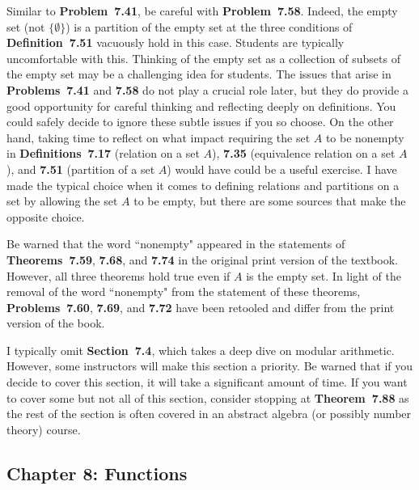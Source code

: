 \documentclass[11pt]{article}%
\newcommand{\blankline}{\pagebreak[2]\vspace{.5\baselineskip}}
\begin{document}
Similar to \textbf{Problem~7.41}, be careful with \textbf{Problem~7.58}. Indeed, the empty set (not $\{\emptyset\}$) is a partition of the empty set at the three conditions of \textbf{Definition~7.51} vacuously hold in this case.  Students are typically uncomfortable with this. Thinking of the empty set as a collection of subsets of the empty set may be a challenging idea for students.  The issues that arise in \textbf{Problems~7.41} and \textbf{7.58} do not play a crucial role later, but they do provide a good opportunity for careful thinking and reflecting deeply on definitions.  You could safely decide to ignore these subtle issues if you so choose.  On the other hand, taking time to reflect on what impact requiring the set $A$ to be nonempty in \textbf{Definitions~7.17} (relation on a set $A$), \textbf{7.35} (equivalence relation on a set $A$), and \textbf{7.51} (partition of a set $A$) would have could be a useful exercise.  I have made the typical choice when it comes to defining relations and partitions on a set by allowing the set $A$ to be empty, but there are some sources that make the opposite choice.

\blankline

Be warned that the word ``nonempty" appeared in the statements of \textbf{Theorems~7.59}, \textbf{7.68}, and \textbf{7.74} in the original print version of the textbook.  However, all three theorems hold true even if $A$ is the empty set.  In light of the removal of the word ``nonempty" from the statement of these theorems, \textbf{Problems~7.60}, \textbf{7.69}, and \textbf{7.72} have been retooled and differ from the print version of the book.

\blankline

I typically omit \textbf{Section~7.4}, which takes a deep dive on modular arithmetic.  However, some instructors will make this section a priority.  Be warned that if you decide to cover this section, it will take a significant amount of time.  If you want to cover some but not all of this section, consider stopping at \textbf{Theorem~7.88} as the rest of the section is often covered in an abstract algebra (or possibly number theory) course.


\subsection*{Chapter 8: Functions}

\end{document}
